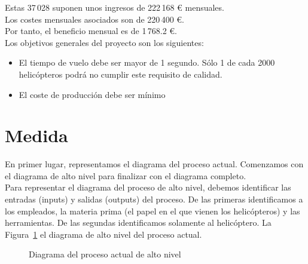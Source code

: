 \documentclass[12pt,a4paper,twoside,openright,titlepage,final]{article}
\begin{document}
Estas 37\,028 suponen unos ingresos de 222\,168 € mensuales.\\

Los costes mensuales asociados son de 220\,400 €.\\

Por tanto, el beneficio mensual es de 1\,768.2 €.\\

Los objetivos generales del proyecto son los siguientes:

\begin{itemize}
	\item El tiempo de vuelo debe ser mayor de 1 segundo. Sólo 1 de cada 2000 helicópteros podrá no cumplir este requisito de calidad.
	\item El coste de producción debe ser mínimo
\end{itemize} 



\section{Medida}

En primer lugar, representamos el diagrama del proceso actual. Comenzamos con el diagrama de alto nivel para finalizar con el diagrama completo.\\

Para representar el diagrama del proceso de alto nivel, debemos identificar las entradas (inputs) y salidas (outputs) del proceso. De las primeras identificamos a los empleados, la materia prima (el papel en el que vienen los helicópteros) y las herramientas. De las segundas identificamos solamente al helicóptero. La Figura~\ref{fig:diagrama_proceso_actual_altoç_nivel} el diagrama de alto nivel del proceso actual.\\

\begin{figure}[htbp!]
	\centering
	\caption{Diagrama del proceso actual de alto nivel}
	\label{fig:diagrama_proceso_actual_altoç_nivel}
\end{figure} 
\end{document}
